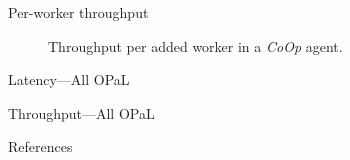 \documentclass[aspectratio=169,xcolor={dvipsnames}
,handout
]{beamer}
\newcommand{\approachshort}{OPaL}
\newcommand{\Coopfw}{\emph{CoOp}}
\begin{document}
\appendix

\begin{frame}{Per-worker throughput}
	\begin{figure}
		\caption{Throughput per added worker in a \Coopfw{} agent.\label{fig:tput-per-core}}
	\end{figure}
\end{frame}

\begin{frame}{Latency---All \approachshort}
	\centering
\end{frame}

\begin{frame}{Throughput---All \approachshort}
	\centering
\end{frame}

\begin{frame}[allowframebreaks]{References}
	\printbibliography[heading=none]
\end{frame}
\end{document}
